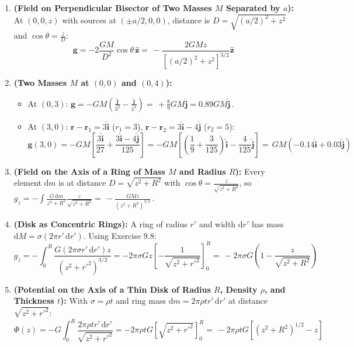 \documentclass[11pt,a4paper,openany,oneside]{book}
\newcommand{\eqbox}[1]{\boxed{\,#1\,}}
\newcommand{\vect}[1]{\mathbf{#1}}
\newcommand{\uv}[1]{\hat{\mathbf{#1}}}
\newcommand{\ihat}{\hat{\mathbf{i}}}
\newcommand{\jhat}{\hat{\mathbf{j}}}
\newcommand{\dd}{\,\mathrm{d}}
\newcommand{\diff}{\mathrm{d}}
\numberwithin{equation}{chapter}
\begin{document}
\begin{enumerate}[label=\textbf{Ex.\ 9.\arabic*},leftmargin=3.5em]
  \item \textbf{(Field on Perpendicular Bisector of Two Masses $M$ Separated by $a$):} At $(0,0,z)$ with sources at $(\pm a/2, 0, 0)$, distance is $D = \sqrt{(a/2)^2 + z^2}$ and $\cos\theta = \frac{z}{D}$:
  \begin{equation*}
    \vect{g} = -2\frac{GM}{D^2}\cos\theta\,\uv{z} = \eqbox{-\frac{2GMz}{\left[(a/2)^2 + z^2\right]^{3/2}}\uv{z}}
  \end{equation*}

  \item \textbf{(Two Masses $M$ at $(0,0)$ and $(0,4)$):}
  \begin{itemize}
    \item At $(0,3)$: $\vect{g} = -GM\!\left(\frac{\jhat}{3^2} - \frac{\jhat}{1^2}\right) = \eqbox{+\frac{8}{9}GM\jhat = 0.89GM\jhat}$.
    \item At $(3,0)$: $\vect{r}-\vect{r}_1 = 3\ihat$ ($r_1=3$), $\vect{r}-\vect{r}_2 = 3\ihat - 4\jhat$ ($r_2=5$):
    \begin{equation*}
      \vect{g}(3,0) = -GM\!\left[\frac{3\ihat}{27} + \frac{3\ihat - 4\jhat}{125}\right] = -GM\!\left[\left(\frac{1}{9}+\frac{3}{125}\right)\ihat - \frac{4}{125}\jhat\right] = \eqbox{GM(-0.14\ihat + 0.03\jhat)}
    \end{equation*}
  \end{itemize}

  \setcounter{enumi}{7}
  \item \textbf{(Field on the Axis of a Ring of Mass $M$ and Radius $R$):} Every element $\diff m$ is at distance $D = \sqrt{z^2+R^2}$ with $\cos\theta = \frac{z}{\sqrt{z^2+R^2}}$, so $g_z = -\int\frac{G\dd m}{z^2+R^2}\frac{z}{\sqrt{z^2+R^2}} = \eqbox{-\frac{GMz}{(z^2+R^2)^{3/2}}}$.

  \item \textbf{(Disk as Concentric Rings):} A ring of radius $r'$ and width $\diff r'$ has mass $\diff M = \sigma(2\pi r'\dd r')$. Using Exercise 9.8:
  \begin{equation*}
    g_z = -\int_0^R \frac{G(2\pi\sigma r'\dd r')z}{(z^2+r'^2)^{3/2}} = -2\pi\sigma G z\!\left[-\frac{1}{\sqrt{z^2+r'^2}}\right]_0^R = \eqbox{-2\pi\sigma G\!\left(1 - \frac{z}{\sqrt{z^2+R^2}}\right)}
  \end{equation*}

  \item \textbf{(Potential on the Axis of a Thin Disk of Radius $R$, Density $\rho$, and Thickness $t$):} With $\sigma = \rho t$ and ring mass $\diff m = 2\pi\rho t r'\dd r'$ at distance $\sqrt{z^2+r'^2}$:
  \begin{equation*}
    \Phi(z) = -G\int_0^R \frac{2\pi\rho t r'\dd r'}{\sqrt{z^2+r'^2}} = -2\pi\rho t G\!\left[\sqrt{z^2+r'^2}\right]_0^R = \eqbox{-2\pi\rho t G\!\left[(z^2+R^2)^{1/2} - z\right]}
  \end{equation*}


\end{enumerate}
\end{document}
